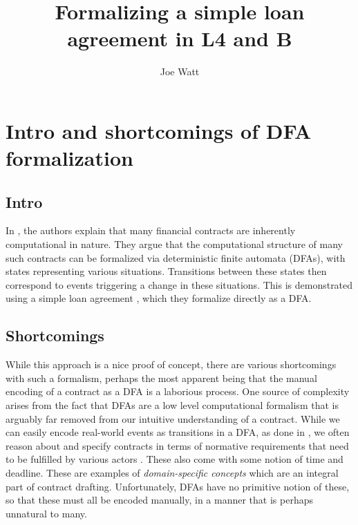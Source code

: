 \documentclass{article}
\title{Formalizing a simple loan agreement in L4 and B}
\author{Joe Watt}
\begin{document}
\maketitle


\tableofcontents

\newpage

\section{Intro and shortcomings of DFA formalization}

\subsection{Intro}


In \cite{contract_as_automaton}, the authors explain that many financial
contracts are inherently computational in nature.
They argue that the computational structure of many such contracts
can be formalized via deterministic finite automata (DFAs), with states
representing various situations.
Transitions between these states then correspond to events triggering a change
in these situations.
This is demonstrated using a simple loan agreement
\cite[Table 1]{contract_as_automaton}, which they formalize
directly as a DFA.

\subsection{Shortcomings}
While this approach is a nice proof of concept, there are various shortcomings
with such a formalism, perhaps the most apparent being that the manual encoding
of a contract as a DFA is a laborious process.
One source of complexity arises from the fact that DFAs are a low level
computational formalism that is arguably far removed from our intuitive
understanding of a contract.
While we can easily encode real-world events as transitions in a DFA, as done
in \cite{contract_as_automaton}, we often reason about and specify contracts in
terms of normative requirements that need to be fulfilled by various actors
\cite{normative_reqs_guido}.
These also come with some notion of time and deadline.
These are examples of \textit{domain-specific concepts} which are an integral
part of contract drafting.
Unfortunately, DFAs have no primitive notion of these, so that these must all
be encoded manually, in a manner that is perhaps unnatural to many.
\end{document}
